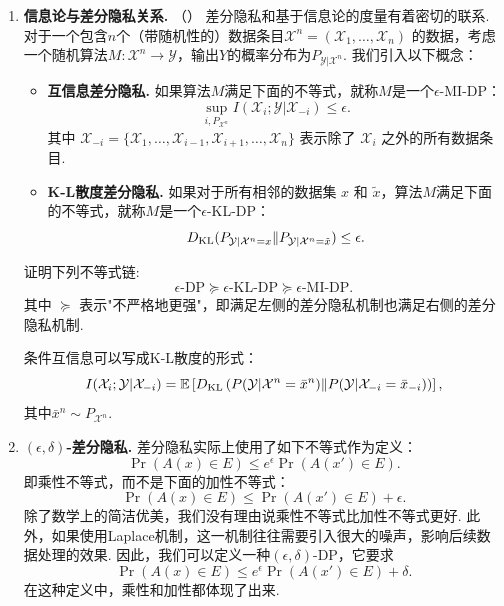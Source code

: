 \begin{enumerate}[wide, labelindent=0pt]
    
    \item \textbf{信息论与差分隐私关系. }（\cite{cuffDifferentialPrivacyMutual2016,mirInformationTheoreticFoundationsDifferential2012}） 差分隐私和基于信息论的度量有着密切的联系. 对于一个包含$n$个（带随机性的）数据条目$\mathcal X^n = (\mathcal X_1, \dots, \mathcal X_n)$ 的数据，考虑一个随机算法$M:\mathcal X^n\to \mathcal Y$，输出$Y$的概率分布为$P_{\mathcal Y|\mathcal X^n}$. 我们引入以下概念：
    \begin{itemize}
        \item \textbf{互信息差分隐私. }如果算法$M$满足下面的不等式，就称$M$是一个$\epsilon$-MI-DP：
        \[
            \sup_{i, P_{\mathcal X^n}} I(\mathcal X_i; \mathcal Y|\mathcal X_{-i}) \leq \epsilon.
        \]
        其中 $\mathcal X_{-i} = \{\mathcal X_1, \dots, \mathcal X_{i-1}, \mathcal X_{i+1}, \dots, \mathcal X_n\}$ 表示除了 $\mathcal X_i$ 之外的所有数据条目.
        \item \textbf{K-L散度差分隐私. }如果对于所有相邻的数据集 $x$ 和 $\tilde{x}$，算法$M$满足下面的不等式，就称$M$是一个$\epsilon$-KL-DP：
        \[
            D_{\mathrm{KL}}(P_{\mathcal Y|\mathcal X^n=x}\| P_{\mathcal Y|\mathcal X^n=\tilde{x}}) \leq \epsilon.
        \]
    \end{itemize}

    证明下列不等式链:
    \[
        \epsilon\text{-DP} \succeq \epsilon\text{-KL-DP} \succeq \epsilon\text{-MI-DP}.
    \]
    其中 $\succeq$ 表示"不严格地更强"，即满足左侧的差分隐私机制也满足右侧的差分隐私机制.
    \begin{hint}
        条件互信息可以写成K-L散度的形式：
            \[
                I(\mathcal X_{i};\mathcal Y|\mathcal X_{-i}) = \mathbb{E} \left[D_{\mathrm{KL}}\left(P(\mathcal Y|\mathcal X^{n}=\bar{x}^n)\Vert P(\mathcal Y|\mathcal X_{-i}=\bar{x}_{-i})\right)\right],
            \]
            其中$\bar{x}^n \sim P_{\mathcal X^n}$.
    \end{hint}

    \item \label{exercise:eps-delta-DP}\textbf{$(\epsilon,\delta)$-差分隐私. }差分隐私实际上使用了如下不等式作为定义：
    \[\Pr(A(x)\in E) \leq e^{\epsilon} \Pr(A(x') \in E).\]
    即乘性不等式，而不是下面的加性不等式：
    \[\Pr(A(x)\in E) \leq \Pr(A(x') \in E) + \epsilon.\]
    除了数学上的简洁优美，我们没有理由说乘性不等式比加性不等式更好. 此外，如果使用Laplace机制，这一机制往往需要引入很大的噪声，影响后续数据处理的效果. 因此，我们可以定义一种$(\epsilon, \delta)$-DP，它要求
    \[
    \Pr(A(x)\in E) \leq e^{\epsilon} \Pr(A(x') \in E) + \delta.
    \]
    在这种定义中，乘性和加性都体现了出来. 
    

\end{enumerate}
